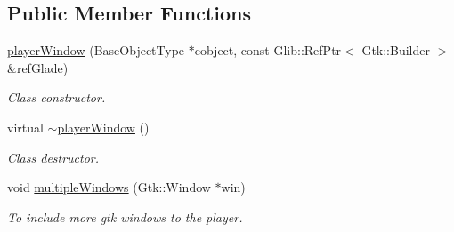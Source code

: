 \subsection*{Public Member Functions}
\begin{DoxyCompactItemize}
\item 
\hyperlink{classplayerWindow_ac572936f2d2366780ab7a0db7d778cc1}{player\-Window} (Base\-Object\-Type $\ast$cobject, const Glib\-::\-Ref\-Ptr$<$ Gtk\-::\-Builder $>$ \&ref\-Glade)
\begin{DoxyCompactList}\small\item\em Class constructor. \end{DoxyCompactList}\item 
virtual \hyperlink{classplayerWindow_a3073e8d52d5d7e7ca57c05eadf6f593a}{$\sim$player\-Window} ()
\begin{DoxyCompactList}\small\item\em Class destructor. \end{DoxyCompactList}\item 
void \hyperlink{classplayerWindow_aa65b921e3572ea50cce75d481d51b855}{multiple\-Windows} (Gtk\-::\-Window $\ast$win)
\begin{DoxyCompactList}\small\item\em To include more gtk windows to the player. \end{DoxyCompactList}\end{DoxyCompactItemize}
